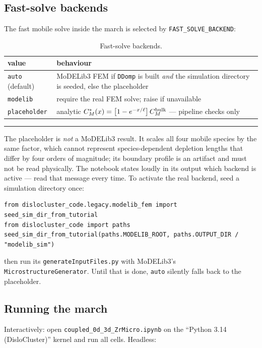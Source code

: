 \documentclass[11pt]{article}
\newcommand{\MoD}{\textsf{MoDELib3}}
\newcommand{\code}[1]{\texttt{\small #1}}
\newcommand{\file}[1]{\texttt{\footnotesize #1}}
\newenvironment{warnbox}
  {\par\medskip\noindent
   \begin{minipage}{\textwidth}
   {\color{red!60!black}\rule{\textwidth}{0.8pt}}\par\smallskip
   \small\noindent{\color{red!60!black}\textbf{Warning.}}\space}
  {\par\smallskip\noindent{\color{red!60!black}\rule{\textwidth}{0.8pt}}
   \end{minipage}\par\medskip}
\begin{document}
\subsection{Fast-solve backends}
\label{sec:backends}

The fast mobile solve inside the march is selected by
\code{FAST\_SOLVE\_BACKEND}:

\begin{table}[htbp]
\centering
\caption{Fast-solve backends.}
\label{tab:backends}
\begin{tabular}{@{}lp{}@{}}
\toprule
value & behaviour \\
\midrule
\code{auto} (default) & \MoD{} FEM if \code{DDomp} is built \emph{and} the
simulation directory is seeded, else the placeholder \\
\code{modelib} & require the real FEM solve; raise if unavailable \\
\code{placeholder} & analytic
$C_M^{*}(x) = \bigl[1-e^{-x/\ell}\bigr]\,C_M^{\rm bulk}$ --- pipeline checks
only \\
\bottomrule
\end{tabular}
\end{table}

\begin{warnbox}
The placeholder is \emph{not} a \MoD{} result. It scales all four mobile
species by the same factor, which cannot represent species-dependent
depletion lengths that differ by four orders of magnitude; its boundary
profile is an artifact and must not be read physically. The notebook states
loudly in its output which backend is active --- read that message every
time. To activate the real backend, seed a simulation directory once:
\begin{lstlisting}[style=py]
from dislocluster_code.legacy.modelib_fem import seed_sim_dir_from_tutorial
from dislocluster_code import paths
seed_sim_dir_from_tutorial(paths.MODELIB_ROOT, paths.OUTPUT_DIR / "modelib_sim")
\end{lstlisting}
then run its \file{generateInputFiles.py} with \MoD{}'s
\code{MicrostructureGenerator}. Until that is done, \code{auto} silently
falls back to the placeholder.
\end{warnbox}

\subsection{Running the march}

Interactively: open \file{coupled\_0d\_3d\_ZrMicro.ipynb} on the
``Python 3.14 (DisloCluster)'' kernel and run all cells. Headless:
\end{document}
